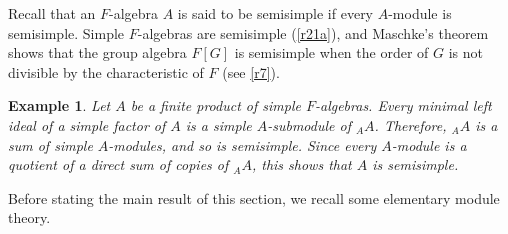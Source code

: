\documentclass[a4paper,11pt,final,openany]{memoir}%
\newtheorem{example}[X]{Example}
\theoremstyle{nonumberplain}
\begin{document}
Recall that an $F$-algebra $A$ is said to be semisimple if every $A$-module is
semisimple. Simple $F$-algebras are semisimple (\ref{r21a}), and Maschke's
theorem shows that the group algebra $F[G]$ is semisimple when the order of
$G$ is not divisible by the characteristic of $F$ (see \ref{r7}).{}

\begin{example}
\label{r24a}Let $A$ be a finite product of simple $F$-algebras. Every minimal
left ideal of a simple factor of $A$ is a simple $A$-submodule of $_{A}A$.
Therefore, $_{A}A$ is a sum of simple $A$-modules, and so is semisimple. Since
every $A$-module is a quotient of a direct sum of copies of $_{A}A$, this
shows that $A$ is semisimple.
\end{example}

Before stating the main result of this section, we recall some elementary
module theory.
\end{document}
